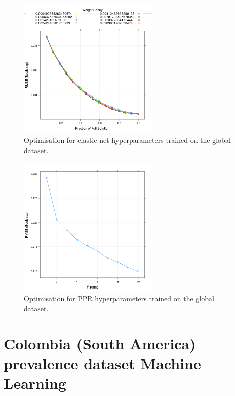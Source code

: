 \documentclass[review]{elsarticle}
\begin{document}
\begin{figure}[h!]
  \centering
  \includegraphics[width=0.6\textwidth]{figs/SI/enetopt_global.png}
\caption{
  Optimisation for elastic net hyperparameters trained on the global dataset.
}
\end{figure}



\begin{figure}[h!]
  \centering
  \includegraphics[width=0.6\textwidth]{figs/SI/ppropt.png}
\caption{
  Optimisation for PPR hyperparameters trained on the global dataset.
}

\end{figure}




\clearpage
\section{Colombia (South America) prevalence dataset Machine Learning}
\end{document}
